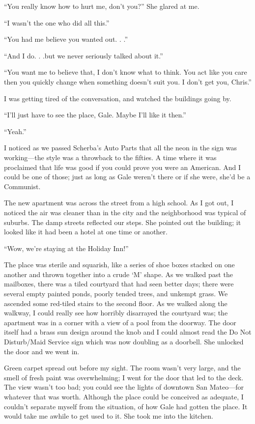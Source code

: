 ``You really know how to hurt me, don't you?'' She glared at me.

``I wasn't the one who did all this.''

``You had me believe you wanted out. . .''

``And I do. . .but we never seriously talked about it.''

``You want me to believe that, I don't know what to think. You act like
you care then you quickly change when something doesn't suit you. I
don't get you, Chris.''

I was getting tired of the conversation, and watched the buildings going
by.

``I'll just have to see the place, Gale. Maybe I'll like it then.''

``Yeah.''

I noticed as we passed Scherba's Auto Parts that all the neon in the
sign was working---the style was a throwback to the fifties. A time
where it was proclaimed that life was good if you could prove you were
an American. And I could be one of those; just as long as Gale weren't
there or if she were, she'd be a Communist.

The new apartment was across the street from a high school. As I got
out, I noticed the air was cleaner than in the city and the neighborhood
was typical of suburbs. The damp streets reflected our steps. She
pointed out the building; it looked like it had been a hotel at one time
or another.

``Wow, we're staying at the Holiday Inn!''

The place was sterile and squarish, like a series of shoe boxes stacked
on one another and thrown together into a crude `M' shape. As we walked
past the mailboxes, there was a tiled courtyard that had seen better
days; there were several empty painted ponds, poorly tended trees, and
unkempt grass. We ascended some red-tiled stairs to the second floor. As
we walked along the walkway, I could really see how horribly disarrayed
the courtyard was; the apartment was in a corner with a view of a pool
from the doorway. The door itself had a brass sun design around the knob
and I could almost read the Do Not Disturb/Maid Service sign which was
now doubling as a doorbell. She unlocked the door and we went in.

Green carpet spread out before my sight. The room wasn't very large, and
the smell of fresh paint was overwhelming; I went for the door that led
to the deck. The view wasn't too bad; you could see the lights of
downtown San Mateo---for whatever that was worth. Although the place
could be conceived as adequate, I couldn't separate myself from the
situation, of how Gale had gotten the place. It would take me awhile to
get used to it. She took me into the kitchen.

